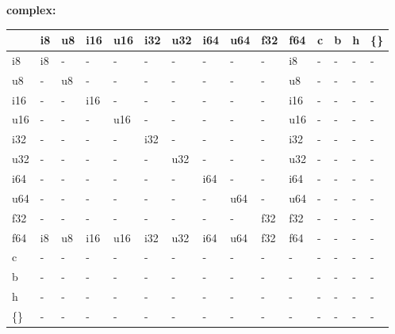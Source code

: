 \textbf{complex:}
\begin{scriptsize}\begin{tt}\begin{center}\vspace{-.3cm}\begin{tabular}{|m{.65cm}||m{.65cm}|m{.65cm}|m{.65cm}|m{.65cm}|m{.65cm}|m{.65cm}|m{.65cm}|m{.65cm}|m{.65cm}|m{.65cm}|m{.65cm}|m{.65cm}|m{.65cm}|m{.65cm}|}\hline 
&i8&u8&i16&u16&i32&u32&i64&u64&f32&f64&c&b&h&\{\}\\ \hline \hline
i8&i8&-&-&-&-&-&-&-&-&i8&-&-&-&-\\ \hline
u8&-&u8&-&-&-&-&-&-&-&u8&-&-&-&-\\ \hline
i16&-&-&i16&-&-&-&-&-&-&i16&-&-&-&-\\ \hline
u16&-&-&-&u16&-&-&-&-&-&u16&-&-&-&-\\ \hline
i32&-&-&-&-&i32&-&-&-&-&i32&-&-&-&-\\ \hline
u32&-&-&-&-&-&u32&-&-&-&u32&-&-&-&-\\ \hline
i64&-&-&-&-&-&-&i64&-&-&i64&-&-&-&-\\ \hline
u64&-&-&-&-&-&-&-&u64&-&u64&-&-&-&-\\ \hline
f32&-&-&-&-&-&-&-&-&f32&f32&-&-&-&-\\ \hline
f64&i8&u8&i16&u16&i32&u32&i64&u64&f32&f64&-&-&-&-\\ \hline
c&-&-&-&-&-&-&-&-&-&-&-&-&-&-\\ \hline
b&-&-&-&-&-&-&-&-&-&-&-&-&-&-\\ \hline
h&-&-&-&-&-&-&-&-&-&-&-&-&-&-\\ \hline
\{\}&-&-&-&-&-&-&-&-&-&-&-&-&-&-\\ \hline
\end{tabular}\end{center}\end{tt}\end{scriptsize} 

